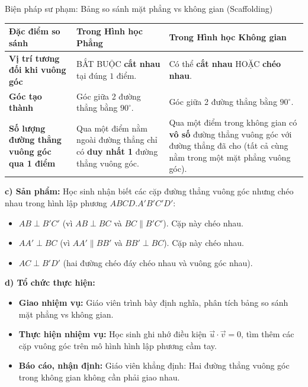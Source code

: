 \documentclass[12pt, a4paper]{article}
\renewcommand{\vec}[1]{\overrightarrow{#1}}
\begin{document}
\begin{scaffoldbox}{Biện pháp sư phạm: Bảng so sánh mặt phẳng vs không gian (Scaffolding)}
\begin{center}
\begin{tabular}{|m{4cm}|m{5cm}|m{5.5cm}|}
\hline
\textbf{Đặc điểm so sánh} & \textbf{Trong Hình học Phẳng} & \textbf{Trong Hình học Không gian} \\ \hline
\textbf{Vị trí tương đối khi vuông góc} & BẮT BUỘC \textbf{cắt nhau} tại đúng $1$ điểm. & Có thể \textbf{cắt nhau} HOẶC \textbf{chéo nhau}. \\ \hline
\textbf{Góc tạo thành} & Góc giữa 2 đường thẳng bằng $90^\circ$. & Góc giữa 2 đường thẳng bằng $90^\circ$. \\ \hline
\textbf{Số lượng đường thẳng vuông góc qua 1 điểm} & Qua một điểm nằm ngoài đường thẳng chỉ có \textbf{duy nhất 1} đường thẳng vuông góc. & Qua một điểm trong không gian có \textbf{vô số} đường thẳng vuông góc với đường thẳng đã cho (tất cả cùng nằm trong một mặt phẳng vuông góc). \\ \hline
\end{tabular}
\end{center}
\end{scaffoldbox}

\noindent \textbf{c) Sản phẩm:}
Học sinh nhận biết các cặp đường thẳng vuông góc nhưng chéo nhau trong hình lập phương $ABCD.A'B'C'D'$:
\begin{itemize}
    \item $AB \perp B'C'$ (vì $AB \perp BC$ và $BC \parallel B'C'$). Cặp này chéo nhau.
    \item $AA' \perp BC$ (vì $AA' \parallel BB'$ và $BB' \perp BC$). Cặp này chéo nhau.
    \item $AC \perp B'D'$ (hai đường chéo đáy chéo nhau và vuông góc nhau).
\end{itemize}

\noindent \textbf{d) Tổ chức thực hiện:}
\begin{itemize}[leftmargin=0.6cm]
    \item \textbf{Giao nhiệm vụ:} Giáo viên trình bày định nghĩa, phân tích bảng so sánh mặt phẳng vs không gian.
    \item \textbf{Thực hiện nhiệm vụ:} Học sinh ghi nhớ điều kiện $\vec{u} \cdot \vec{v} = 0$, tìm thêm các cặp vuông góc trên mô hình hình lập phương cầm tay.
    \item \textbf{Báo cáo, nhận định:} Giáo viên khẳng định: Hai đường thẳng vuông góc trong không gian không cần phải giao nhau.
\end{itemize}
\end{document}
